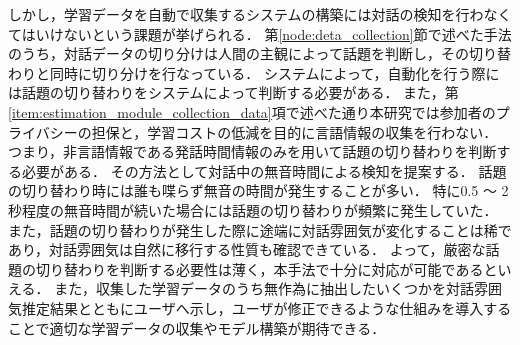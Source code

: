しかし，学習データを自動で収集するシステムの構築には対話の検知を行わなくてはいけないという課題が挙げられる．
第\ref{node:deta_collection}節で述べた手法のうち，対話データの切り分けは人間の主観によって話題を判断し，その切り替わりと同時に切り分けを行なっている．
システムによって，自動化を行う際には話題の切り替わりをシステムによって判断する必要がある．
また，第\ref{item:estimation_module_collection_data}項で述べた通り本研究では参加者のプライバシーの担保と，学習コストの低減を目的に言語情報の収集を行わない．
つまり，非言語情報である発話時間情報のみを用いて話題の切り替わりを判断する必要がある．
その方法として対話中の無音時間による検知を提案する．
話題の切り替わり時には誰も喋らず無音の時間が発生することが多い．
特に0.5 〜 2秒程度の無音時間が続いた場合には話題の切り替わりが頻繁に発生していた．
また，話題の切り替わりが発生した際に途端に対話雰囲気が変化することは稀であり，対話雰囲気は自然に移行する性質も確認できている．
よって，厳密な話題の切り替わりを判断する必要性は薄く，本手法で十分に対応が可能であるといえる．
また，収集した学習データのうち無作為に抽出したいくつかを対話雰囲気推定結果とともにユーザへ示し，ユーザが修正できるような仕組みを導入することで適切な学習データの収集やモデル構築が期待できる．
